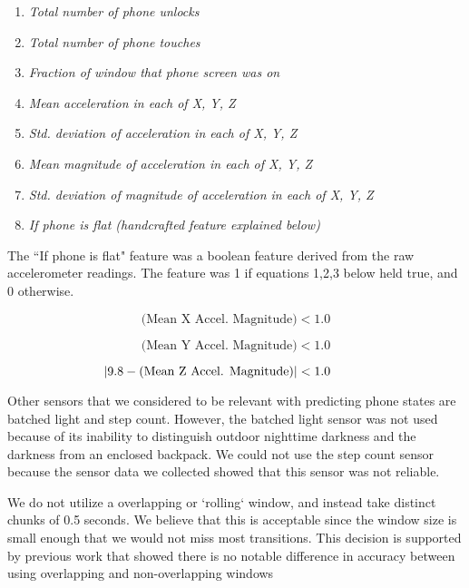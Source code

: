 \begin{enumerate}
\item \textit{Total number of phone unlocks}
\item \textit{Total number of phone touches}
\item \textit{Fraction of window that phone screen was on}
\item \textit{Mean acceleration in each of X, Y, Z}
\item \textit{Std. deviation of acceleration in each of X, Y, Z}
\item \textit{Mean magnitude of acceleration in each of X, Y, Z}
\item \textit{Std. deviation of magnitude of acceleration in each of X, Y, Z}
\item \textit{If phone is flat (handcrafted feature explained below)}
\end{enumerate}

The ``If phone is flat" feature was a boolean feature derived from the raw accelerometer readings. 
The feature was 1 if equations 1,2,3 below held true, and 0 otherwise.

\begin{equation}\label{eq1}
 \text{(Mean X Accel. Magnitude)} < 1.0 
\end{equation}

\begin{equation}\label{eq2}
\text{(Mean Y Accel. Magnitude)} < 1.0
\end{equation}

\begin{equation}\label{eq1}
\hspace*{-1cm}|9.8 - \text{(Mean Z Accel. Magnitude)}| < 1.0
\end{equation}

Other sensors that we considered to be relevant with predicting phone states are batched light and step count.
However, the batched light sensor was not used because of its inability to distinguish outdoor nighttime darkness and the darkness from an enclosed backpack. 
We could not use the step count sensor because the sensor data we collected showed that this sensor was not reliable. 

We do not utilize a overlapping or `rolling` window, and instead take distinct chunks of 0.5 seconds.
We believe that this is acceptable since the window size is small enough that we would not miss most transitions.
This decision is supported by previous work that showed there is no notable difference in accuracy between using overlapping and non-overlapping windows \cite{Martin2013}


